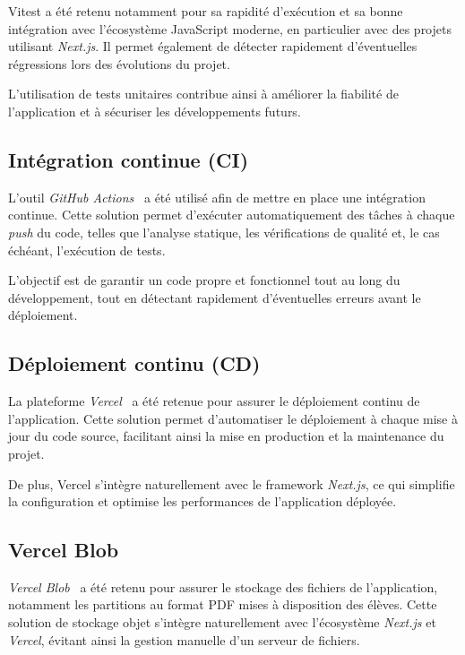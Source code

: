 \documentclass{article}
\begin{document}
Vitest a été retenu notamment pour sa rapidité d’exécution et sa bonne intégration avec l’écosystème JavaScript moderne, en particulier avec des projets utilisant \textit{Next.js}. Il permet également de détecter rapidement d’éventuelles régressions lors des évolutions du projet.

L’utilisation de tests unitaires contribue ainsi à améliorer la fiabilité de l’application et à sécuriser les développements futurs.

\subsection{Intégration continue (CI)}

L’outil \textit{GitHub Actions}~\cite{githubactions} a été utilisé afin de mettre en place une intégration continue. Cette solution permet d’exécuter automatiquement des tâches à chaque \textit{push} du code, telles que l’analyse statique, les vérifications de qualité et, le cas échéant, l’exécution de tests.

L’objectif est de garantir un code propre et fonctionnel tout au long du développement, tout en détectant rapidement d’éventuelles erreurs avant le déploiement.

\subsection{Déploiement continu (CD)}

La plateforme \textit{Vercel}~\cite{vercel} a été retenue pour assurer le déploiement continu de l’application. Cette solution permet d’automatiser le déploiement à chaque mise à jour du code source, facilitant ainsi la mise en production et la maintenance du projet.

De plus, Vercel s’intègre naturellement avec le framework \textit{Next.js}, ce qui simplifie la configuration et optimise les performances de l’application déployée.

\subsection{Vercel Blob}

\textit{Vercel Blob}~\cite{vercelblob} a été retenu pour assurer le stockage des fichiers 
de l'application, notamment les partitions au format PDF mises à 
disposition des élèves. Cette solution de stockage objet s'intègre 
naturellement avec l'écosystème \textit{Next.js} et \textit{Vercel}, 
évitant ainsi la gestion manuelle d'un serveur de fichiers.
\end{document}
